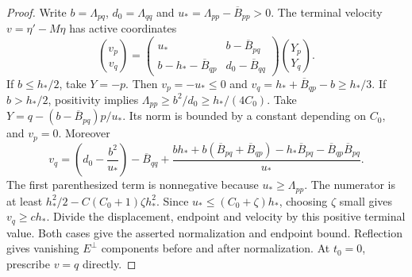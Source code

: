 \documentclass[11pt]{article}
\theoremstyle{definition}
\begin{document}
\begin{proof}
Write $b=\Lambda_{pq}$, $d_0=\Lambda_{qq}$ and
$u_*=\Lambda_{pp}-\overline B_{pp}>0$. The terminal velocity
$v=\eta'-M\eta$ has active coordinates
\[
 \binom{v_p}{v_q}=
 \begin{pmatrix}u_*&b-\overline B_{pq}\\
 b-h_*-\overline B_{qp}&d_0-\overline B_{qq}\end{pmatrix}
 \binom{Y_p}{Y_q}.
\]
If $b\leq h_*/2$, take $Y=-p$. Then $v_p=-u_*\leq0$ and
$v_q=h_*+\overline B_{qp}-b\geq h_*/3$.
If $b>h_*/2$, positivity implies
$\Lambda_{pp}\geq b^2/d_0\geq h_*/(4C_0)$.
Take $Y=q-(b-\overline B_{pq})p/u_*$. Its norm is bounded by a
constant depending on $C_0$, and $v_p=0$. Moreover
\[
 v_q=\left(d_0-\frac{b^2}{u_*}\right)-\overline B_{qq}
 +\frac{bh_*+b(\overline B_{pq}+\overline B_{qp})
       -h_*\overline B_{pq}-\overline B_{qp}\overline B_{pq}}{u_*}.
\]
The first parenthesized term is nonnegative because $u_*\geq\Lambda_{pp}$.
The numerator is at least $h_*^2/2-C(C_0+1)\zeta h_*^2$.
Since $u_*\leq(C_0+\zeta)h_*$, choosing $\zeta$ small gives
$v_q\geq c h_*$. Divide the displacement, endpoint and velocity by
this positive terminal value. Both cases give the asserted normalization
and endpoint bound. Reflection gives vanishing $E^\perp$ components
before and after normalization. At $t_0=0$, prescribe $v=q$ directly.
\end{proof}
\end{document}

